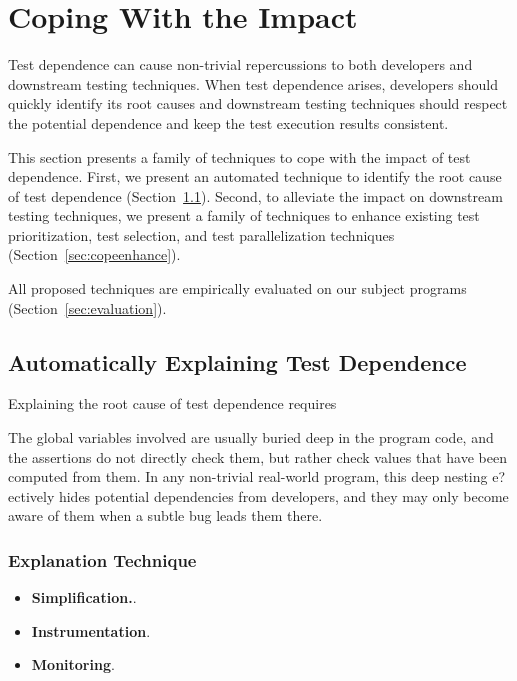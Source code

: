 \section{Coping With the Impact}
\label{sec:cope}

Test dependence can cause non-trivial repercussions
to both developers and downstream testing techniques.
When test dependence arises, developers should quickly
identify its root causes and downstream testing techniques
should respect the potential dependence and keep the
test execution results consistent.

This section presents a family of techniques to cope with the
impact of test dependence. First, we present an automated
technique to identify the root cause of test dependence
(Section~\ref{sec:coperoot}). Second, to alleviate the
impact on downstream testing techniques, we present a family
of techniques to enhance existing test prioritization,
test selection, and test parallelization techniques (Section~\ref{sec:copeenhance}).

All proposed techniques are empirically evaluated on
our subject programs (Section~\ref{sec:evaluation}).

\subsection{Automatically Explaining Test Dependence}
\label{sec:coperoot}

Explaining the root cause of test dependence requires

The global variables involved are usually buried deep in
the program code, and the assertions do not directly check
them, but rather check values that have been computed from
them. In any non-trivial real-world program, this deep nesting e?ectively hides potential dependencies from developers,
and they may only become aware of them when a subtle bug
leads them there.


\subsubsection{Explanation Technique}

\begin{itemize}
\item \textbf{Simplification.}.
\item \textbf{Instrumentation}.
\item \textbf{Monitoring}.
\end{itemize}



